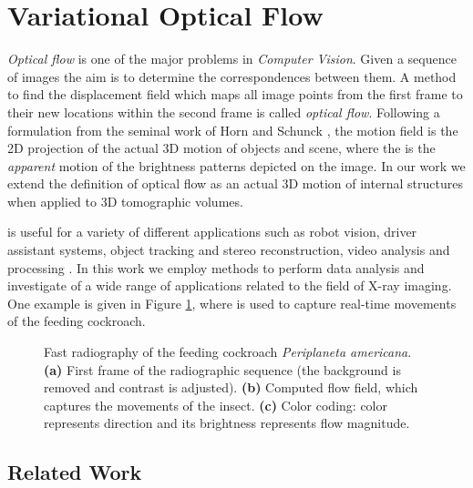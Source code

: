 \section{Variational Optical Flow}

\textit{Optical flow} is one of the major problems in \textit{Computer Vision}.  Given a sequence of images the aim is to determine the correspondences between them. A method to find the displacement field which maps all image points from the first frame to their new locations within the second frame is called \textit{optical flow}. Following a formulation from the seminal work of Horn and Schunck \cite{HornSchunck81}, the motion field is the 2D projection of the actual 3D motion of objects and scene, where the \opticalflow is the \textit{apparent} motion of the brightness patterns depicted on the image.   In our work we extend the definition of optical flow as an actual 3D motion of internal structures when applied to 3D tomographic volumes.

\Opticalflow is useful for a variety of different applications such as robot vision, driver assistant systems, object tracking and stereo reconstruction, video analysis and processing \cite{Wolf96, Sudhir96, Kastrinaki03, Hu04}.    In this work we employ \opticalflow methods to perform data analysis and investigate of a wide range of applications related to the field of X-ray imaging. One example is given in Figure \ref{fig:example_feeding_insect}, where \opticalflow is used to capture real-time movements of the feeding cockroach.

\begin{figure}[ht]
  \centerline{
    \mbox{}
    \mbox{}
    \mbox{}
  }
  \caption[]{Fast radiography of the feeding cockroach \textit{Periplaneta americana}. \textbf{(a)} First frame of the  radiographic sequence (the background is removed and contrast is adjusted). \textbf{(b)} Computed flow field, which captures the movements of the insect. \textbf{(c)}  Color coding: color represents direction and its brightness represents flow magnitude.}
  \label{fig:example_feeding_insect}
\end{figure}


\subsection{Related Work}

